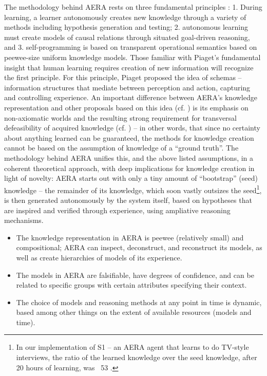 \documentclass[runningheads]{llncs}
\begin{document}
The methodology behind AERA rests on three fundamental principles \cite{thorisson_seed-programmed_2020,thorisson2012new,nivel2009self}: 1. During learning, a learner autonomously creates new knowledge through a variety of methods including hypothesis generation and testing; 2. autonomous learning must create models of causal relations through situated goal-driven reasoning, and 3. self-programming is based on transparent operational semantics based on peewee-size uniform knowledge models. Those familiar with Piaget’s \cite{berlyne2003psychology} fundamental insight that human learning requires creation of new information will recognize the first principle. For this principle, Piaget proposed the idea of schemas – information structures that mediate between perception and action, capturing and controlling experience. An important difference between AERA’s knowledge representation and other proposals based on this idea (cf. \cite{arbib2003handbook,drescher_made-up_1991}) is its emphasis on non-axiomatic worlds and the resulting strong requirement for transversal defeasibility of acquired knowledge (cf. \cite{pollock1987defeasible}) – in other words, that since no certainty about anything learned can be guaranteed, the methods for knowledge creation cannot be based on the assumption of knowledge of a “ground truth”. The methodology behind AERA unifies this, and the above listed assumptions, in a coherent theoretical approach, with deep implications for knowledge creation in light of novelty: AERA starts out with only a tiny amount of “bootstrap” (seed) knowledge – the remainder of its knowledge, which soon vastly outsizes the seed\footnote{In our implementation of S1 – an AERA agent that learns to do TV-style interviews, the ratio of the learned knowledge over the seed knowledge, after 20 hours of learning, was ~53 \cite{thorisson2014autonomous}.}, is then generated autonomously by the system itself, based on hypotheses that are inspired and verified through experience, using ampliative reasoning mechanisms. 

\begin{itemize}
	\item The knowledge representation in AERA is peewee (relatively small) and compositional; AERA can inspect, deconstruct, and reconstruct its models, as well as create hierarchies of models of its experience.
	\item The models in AERA are falsifiable, have degrees of confidence, and can be related to specific groups with certain attributes specifying their context.
	\item The choice of models and reasoning methods at any point in time is dynamic, based among other things on the extent of available resources (models and time).
	
\end{itemize}
\end{document}
